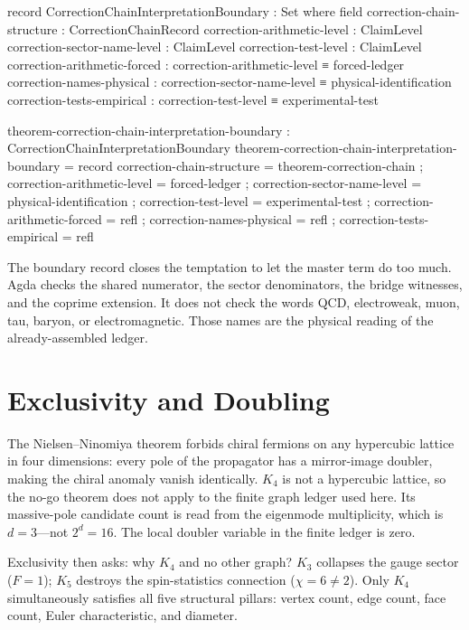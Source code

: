 \documentclass[11pt,a4paper]{book}
\begin{document}
\begin{code}
record CorrectionChainInterpretationBoundary : Set where
  field
    correction-chain-structure : CorrectionChainRecord
    correction-arithmetic-level : ClaimLevel
    correction-sector-name-level : ClaimLevel
    correction-test-level : ClaimLevel
    correction-arithmetic-forced : correction-arithmetic-level ≡ forced-ledger
    correction-names-physical : correction-sector-name-level ≡ physical-identification
    correction-tests-empirical : correction-test-level ≡ experimental-test

theorem-correction-chain-interpretation-boundary : CorrectionChainInterpretationBoundary
theorem-correction-chain-interpretation-boundary = record
  { correction-chain-structure = theorem-correction-chain
  ; correction-arithmetic-level = forced-ledger
  ; correction-sector-name-level = physical-identification
  ; correction-test-level = experimental-test
  ; correction-arithmetic-forced = refl
  ; correction-names-physical = refl
  ; correction-tests-empirical = refl }
\end{code}

The boundary record closes the temptation to let the master term do too much.
Agda checks the shared numerator, the sector denominators, the bridge witnesses,
and the coprime extension.  It does not check the words QCD, electroweak,
muon, tau, baryon, or electromagnetic.  Those names are the physical reading of
the already-assembled ledger.

\chapter{Exclusivity and Doubling}
\label{ch:exclusivity-doubling}

The Nielsen--Ninomiya theorem forbids chiral fermions on any hypercubic
lattice in four dimensions: every pole of the propagator has a mirror-image
doubler, making the chiral anomaly vanish identically.  $K_4$ is not a
hypercubic lattice, so the no-go theorem does not apply to the finite graph
ledger used here.  Its massive-pole candidate count is read from the eigenmode
multiplicity, which is $d = 3$---not $2^d = 16$.  The local doubler variable in
the finite ledger is zero.

Exclusivity then asks: why $K_4$ and no other graph?  $K_3$ collapses the
gauge sector ($F = 1$); $K_5$ destroys the spin-statistics connection
($\chi = 6 \neq 2$).  Only $K_4$ simultaneously satisfies all five
structural pillars: vertex count, edge count, face count, Euler characteristic,
and diameter.
\end{document}
